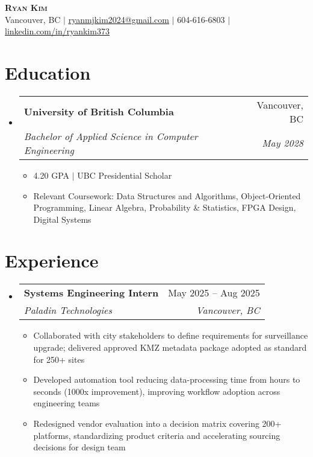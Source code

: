 \documentclass[letterpaper,11pt]{article}
\makeatletter
\newcommand{\resumeItem}[1]{
  \item\small{
    {#1 \vspace{-2pt}}
  }
}
\newcommand{\resumeSubheading}[4]{
  \vspace{-2pt}\item
    \begin{tabular*}{0.97\textwidth}[t]{l@{\extracolsep{\fill}}r}
      \textbf{#1} & #2 \\
      \textit{\small#3} & \textit{\small #4} \\
    \end{tabular*}\vspace{-9pt}
}
\newcommand{\resumeSubHeadingListStart}{\begin{itemize}[leftmargin=0.15in, label={}]}
\newcommand{\resumeSubHeadingListEnd}{\end{itemize}}
\newcommand{\resumeItemListStart}{\begin{itemize}}
\newcommand{\resumeItemListEnd}{\end{itemize}\vspace{-7pt}}
\makeatother
\begin{document}
\begin{center}
    \textbf{\Huge \scshape Ryan Kim} \\ \vspace{5pt}
    \small Vancouver, BC $|$ \href{mailto:ryanmjkim2024@gmail.com}{\underline{ryanmjkim2024@gmail.com}} $|$ 
    604-616-6803 $|$ 
    \href{https://linkedin.com/in/ryankim373}{\underline{linkedin.com/in/ryankim373}}
\end{center}

\section{Education}
\vspace{2pt}
  \resumeSubHeadingListStart
    \resumeSubheading
      {University of British Columbia}{Vancouver, BC}
      {Bachelor of Applied Science in Computer Engineering}{May 2028}
      \resumeItemListStart
        \resumeItem{4.20 GPA $|$ UBC Presidential Scholar}
        \resumeItem{Relevant Coursework: Data Structures and Algorithms, Object-Oriented Programming, Linear Algebra, Probability \& Statistics, FPGA Design, Digital Systems}
      \resumeItemListEnd
  \resumeSubHeadingListEnd

\section{Experience}
  \resumeSubHeadingListStart
    \vspace{2pt}
    \resumeSubheading
    {Systems Engineering Intern}{May 2025 -- Aug 2025}
    {Paladin Technologies}{Vancouver, BC}
    \resumeItemListStart
      \resumeItem{Collaborated with city stakeholders to define requirements for surveillance upgrade; delivered approved KMZ metadata package adopted as standard for 250+ sites}
      \resumeItem{Developed automation tool reducing data-processing time from hours to seconds (1000x improvement), improving workflow adoption across engineering teams}
      \resumeItem{Redesigned vendor evaluation into a decision matrix covering 200+ platforms, standardizing product criteria and accelerating sourcing decisions for design team}
    \resumeItemListEnd
  \resumeSubHeadingListEnd

\end{document}
